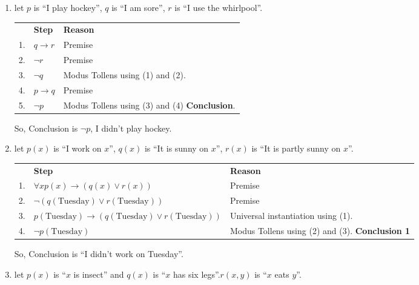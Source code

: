\begin{enumerate}
    \item let $p$ is ``I play hockey'', $q$ is ``I am sore'', $r$ is ``I use the whirlpool''.

    \begin{tabular}{p{0.2cm} p{5cm} p{8cm}}
        & \textbf{Step} & \textbf{Reason}\\
        1.& $q \rightarrow r$ & Premise\\
        2.& $\neg r$ & Premise\\
        3.& $\neg q$ & Modus Tollens using (1) and (2).\\
        4.& $p \rightarrow q$ & Premise \\
        5.& $\neg p$ & Modus Tollens using (3) and (4) \textbf{Conclusion}.
    \end{tabular}

    So, Conclusion is $\neg p$, I didn't play hockey.

    \item let $p(x)$ is ``I work on $x$'', $q(x)$ is ``It is sunny on $x$'', $r(x)$ is ``It is partly sunny on $x$''.
    
    \begin{tabular}{p{0.2cm} p{5cm} p{8cm}}
        & \textbf{Step} & \textbf{Reason}\\
        1.& $\forall x p(x) \rightarrow (q(x) \vee r(x))$ & Premise \\
        2.& $\neg (q(\text{Tuesday}) \vee r(\text{Tuesday}))$ & Premise \\
        3.& $p(\text{Tuesday}) \rightarrow (q(\text{Tuesday}) \vee r(\text{Tuesday}))$ & Universal instantiation using (1).\\
        4.& $\neg p(\text{Tuesday})$ & Modus Tollens using (2) and (3). \textbf{Conclusion 1}\\
    \end{tabular}

    So, Conclusion is ``I didn't work on Tuesday''.

    \item let $p(x)$ is ``$x$ is insect'' and $q(x)$ is ``$x$ has six legs''.$r(x, y)$ is ``$x$ eats $y$''.
    

\end{enumerate}

